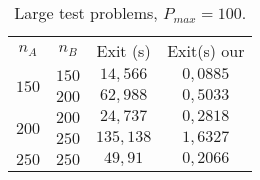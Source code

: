 \documentclass[opre,nonblindrev]{informs3} %
\begin{document}
\begin{table}[h]\scriptsize
	\begin{center}
		\begin{tabular}{|| c | c|| c||c ||}\hline
			
			  \multirow{3}{*}{$n_A$} & \multirow{3}{*}{$n_B$} & \multirow{3}{*}{Exit (s)} & \multirow{3}{*}{Exit(s) our}\\
			 &&  & \\
		    &    & &\\\hline
			 \multirow{2}{*}{$150$}   & $150$   &$14,566$
			& $0,0885$
			\\
			 & $200$	 &$ 62,988$
			&$0,5033$
			\\ \hline
			
			\multirow{2}{*}{$200$}   & $200$   &$ 24,737$
			&$0,2818$
			\\
			& $250$	 &$135,138$
			&$1,6327$
			\\ \hline
			
			 $250$   & $250$   &  $49,91$
			&$0,2066$
			\\ \hline
			
		\end{tabular}
	\end{center}
	\caption{Large test problems, $P_{max}= 100.$} \label{large}
\end{table}
\end{document}
